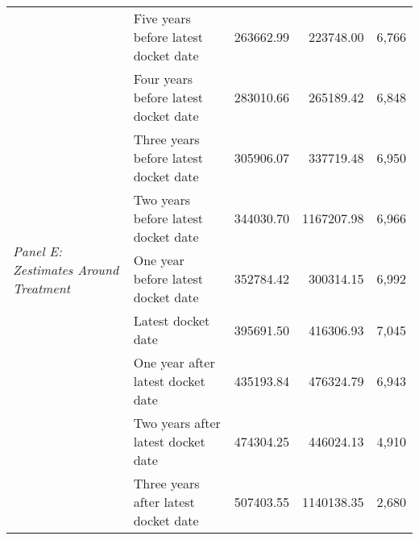 \begin{tabular}{llrrr}
\cline{1-5}
\multirow[c]{9}{*}{\textit{Panel E: Zestimates Around Treatment}} & Five years before latest docket date & 263662.99 & 223748.00 & 6,766 \\
 & Four years before latest docket date & 283010.66 & 265189.42 & 6,848 \\
 & Three years before latest docket date & 305906.07 & 337719.48 & 6,950 \\
 & Two years before latest docket date & 344030.70 & 1167207.98 & 6,966 \\
 & One year before latest docket date & 352784.42 & 300314.15 & 6,992 \\
 & Latest docket date & 395691.50 & 416306.93 & 7,045 \\
 & One year after latest docket date & 435193.84 & 476324.79 & 6,943 \\
 & Two years after latest docket date & 474304.25 & 446024.13 & 4,910 \\
 & Three years after latest docket date & 507403.55 & 1140138.35 & 2,680 \\
\cline{1-5}
\bottomrule
\end{tabular}
